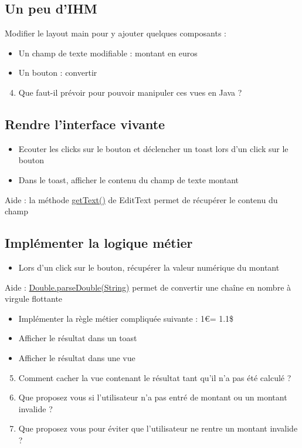 \documentclass{article}
\begin{document}
\subsection{Un peu d'IHM}
Modifier le layout main pour y ajouter quelques composants :
\begin{itemize}
\item Un champ de texte modifiable : montant en euros
\item Un bouton : convertir
\end{itemize}
\begin{enumerate}
 \setcounter{enumi}{3}
\item Que faut-il prévoir pour pouvoir manipuler ces vues en Java ?
\end{enumerate}
\subsection{Rendre l'interface vivante}
\begin{itemize}
\item Ecouter les clicks sur le bouton et déclencher un toast lors d'un click sur le bouton
\item Dans le toast, afficher le contenu du champ de texte montant
\end{itemize}
Aide : la méthode
\href{http://developer.android.com/reference/android/widget/EditText.html#getText()}{getText()} de EditText permet de récupérer le contenu du champ
\subsection{Implémenter la logique métier}
\begin{itemize}
\item Lors d'un click sur le bouton, récupérer la valeur numérique du montant
\end{itemize}
Aide :
\href{http://developer.android.com/reference/java/lang/Double.html#parseDouble(java.lang.String)}{Double.parseDouble(String)}
permet de convertir une chaîne en nombre à virgule flottante
\begin{itemize}
\item Implémenter la règle métier compliquée suivante : 1\euro  = 1.1\$
\item Afficher le résultat dans un toast
\item Afficher le résultat dans une vue
\end{itemize}
\begin{enumerate}
 \setcounter{enumi}{4}
\item Comment cacher la vue contenant le résultat tant qu'il n'a pas été
calculé ?
\item Que proposez vous si l'utilisateur n'a pas entré de montant ou un montant
invalide ?
\item Que proposez vous pour éviter que l'utilisateur ne rentre un montant
invalide ?
\end{enumerate}
\end{document}
